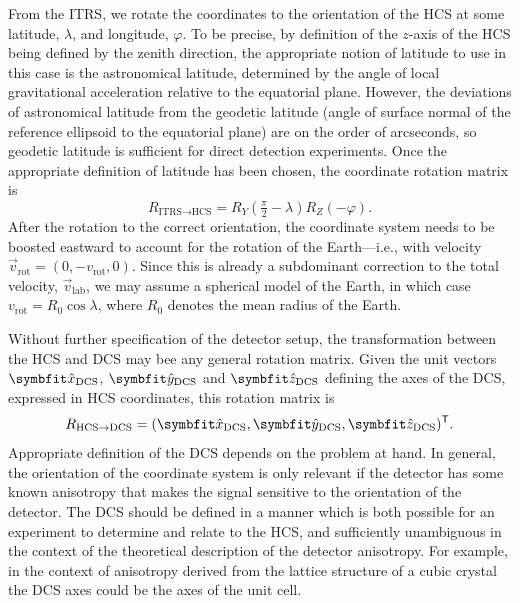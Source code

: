 From the ITRS, we rotate the coordinates to the orientation of the HCS at some latitude, $\lambda$, and longitude, $\varphi$. To be precise, by definition of the $z$-axis of the HCS being defined by the zenith direction, the appropriate notion of latitude to use in this case is the astronomical latitude, determined by the angle of local gravitational acceleration relative to the equatorial plane. However, the deviations of astronomical latitude from the geodetic latitude (angle of surface normal of the reference ellipsoid to the equatorial plane) are on the order of arcseconds, so geodetic latitude is sufficient for direct detection experiments. Once the appropriate definition of latitude has been chosen, the coordinate rotation matrix is
\begin{equation}
    R_{\text{ITRS}\rightarrow\text{HCS}}=R_Y(\tfrac{\pi}{2}-\lambda)R_Z(-\varphi).
\end{equation}
After the rotation to the correct orientation, the coordinate system needs to be boosted eastward to account for the rotation of the Earth---i.e., with velocity $\vec{v}_\text{rot}=(0,-v_\text{rot},0)$. Since this is already a subdominant correction to the total velocity, $\vec{v}_\text{lab}$, we may assume a spherical model of the Earth, in which case $v_\text{rot}=R_0\cos\lambda$, where $R_0$ denotes the mean radius of the Earth.

Without further specification of the detector setup, the transformation between the HCS and DCS may bee any general rotation matrix. Given the unit vectors $\unitv{x}_\text{DCS}$, $\unitv{y}_\text{DCS}$ and $\unitv{z}_\text{DCS}$ defining the axes of the DCS, expressed in HCS coordinates, this rotation matrix is
\begin{equation}
    R_{\text{HCS}\rightarrow\text{DCS}}=
    (
        \unitv{x}_\text{DCS},
        \unitv{y}_\text{DCS},
        \unitv{z}_\text{DCS}
    )^\transp.
\end{equation}
Appropriate definition of the DCS depends on the problem at hand. In general, the orientation of the coordinate system is only relevant if the detector has some known anisotropy that makes the signal sensitive to the orientation of the detector. The DCS should be defined in a manner which is both possible for an experiment to determine and relate to the HCS, and sufficiently unambiguous in the context of the theoretical description of the detector anisotropy. For example, in the context of anisotropy derived from the lattice structure of a cubic crystal the DCS axes could be the axes of the unit cell.

